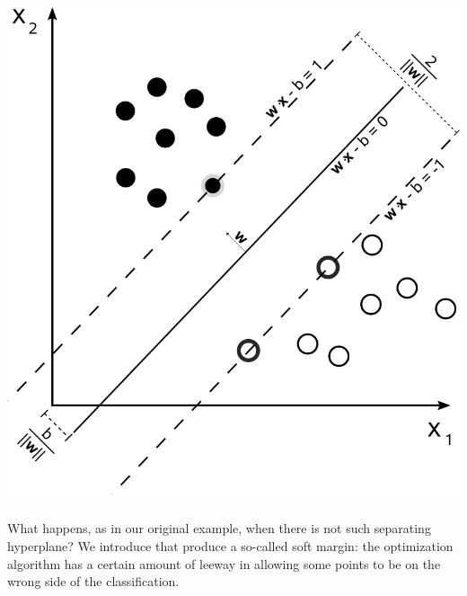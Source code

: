 \documentclass[xetex,mathserif,serif,aspectratio=169]{beamer}
\begin{document}
\begin{frame}[fragile] \frametitle{} \oldB \small

\begin{center}
\includegraphics[height=0.7\textheight]{img/svmHardMargin.png}
\end{center}

\end{frame}

\begin{frame}[fragile] \frametitle{} \oldB \small

\textbf{}

What happens, as in our original example, when there is not such separating
hyperplane? We introduce  that produce a so-called
soft margin: the optimization algorithm has a certain amount of leeway in
allowing some points to be on the wrong side of the classification.

\end{frame}
\end{document}
